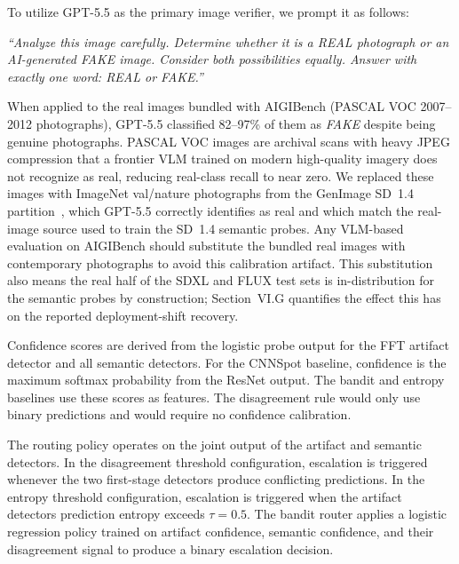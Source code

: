 \documentclass{ieeeaccess}
\begin{document}
To utilize GPT-5.5 as the primary image verifier, we prompt it as follows:

\noindent
\begin{minipage}{\linewidth}
\vspace{10pt}
\itshape
``Analyze this image carefully. Determine whether it is a REAL photograph or an AI-generated FAKE image. Consider both possibilities equally. Answer with exactly one word: REAL or FAKE.''
\vspace{10pt}
\end{minipage}

When applied to the real images bundled with AIGIBench (PASCAL VOC 2007--2012
photographs), GPT-5.5 classified 82--97\% of them as \emph{FAKE} despite being
genuine photographs. PASCAL VOC images are archival scans with heavy JPEG
compression that a frontier VLM trained on modern high-quality imagery does not
recognize as real, reducing real-class recall to near zero. We replaced these
images with ImageNet val/nature photographs from the GenImage SD~1.4
partition~\cite{NEURIPS2023_f4d4a021}, which GPT-5.5 correctly identifies as real
and which match the real-image source used to train the SD~1.4 semantic probes.
Any VLM-based evaluation on AIGIBench should substitute the bundled real images
with contemporary photographs to avoid this calibration artifact. This
substitution also means the real half of the SDXL and FLUX test sets is
in-distribution for the semantic probes by construction; Section~VI.G
quantifies the effect this has on the reported deployment-shift recovery.


Confidence scores are derived from the logistic probe output for the FFT artifact detector and all semantic detectors. For the CNNSpot baseline, confidence is the maximum softmax probability from the ResNet output. The bandit and entropy baselines use these scores as features. The disagreement rule would only use binary predictions and would require no confidence
calibration.

The routing policy operates on the joint output of the artifact and semantic detectors. 
In the disagreement threshold configuration, escalation is triggered whenever the two first-stage detectors produce conflicting 
predictions. In the entropy threshold configuration, escalation is 
triggered when the artifact detectors prediction entropy exceeds $\tau = 0.5$. The 
bandit router applies a logistic regression policy trained on artifact
confidence, semantic confidence, and their disagreement signal to produce 
a binary escalation decision.
\end{document}
